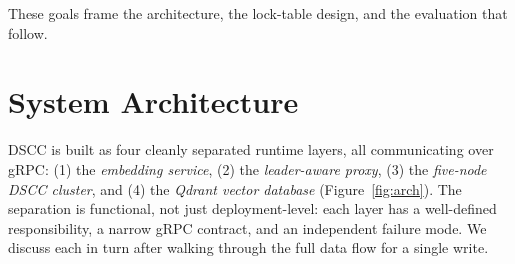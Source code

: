 \documentclass[sigconf]{acmart}
\begin{document}
These goals frame the architecture, the lock-table design, and the
evaluation that follow.
\section{System Architecture}
\label{sec:arch}



DSCC is built as four cleanly separated runtime layers, all communicating
over gRPC: (1) the \emph{embedding service}, (2) the \emph{leader-aware
proxy}, (3) the \emph{five-node DSCC cluster}, and (4) the \emph{Qdrant
vector database} (Figure~\ref{fig:arch}). The separation is functional, not
just deployment-level: each layer has a well-defined responsibility, a
narrow gRPC contract, and an independent failure mode. We discuss each in
turn after walking through the full data flow for a single write.
\end{document}
